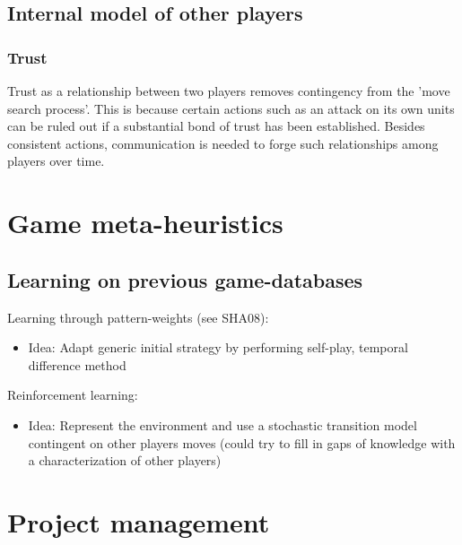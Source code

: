 \documentclass[12pt]{article}
\begin{document}
\subsection{Internal model of other players}

\subsubsection{Trust}

Trust as a relationship between two players removes contingency
from the 'move search process'. This is because certain actions such
as an attack on its own units can be ruled out if a substantial bond of trust
has been established. Besides consistent actions, communication
is needed to forge such relationships among players over time. 

\section{Game meta-heuristics}

\subsection{Learning on previous game-databases}
Learning through pattern-weights (see SHA08):
\vspace{-2mm}
\begin{itemize}
\item[] Idea: Adapt generic initial strategy by performing 
self-play, temporal difference method
\end{itemize}
Reinforcement learning:
\vspace{-2mm}
\begin{itemize}
\item[] Idea: Represent the environment and use a stochastic transition model 
contingent on other players moves (could try to fill in gaps of knowledge with 
a characterization of other players)
\end{itemize}

\section{Project management}
\end{document}
